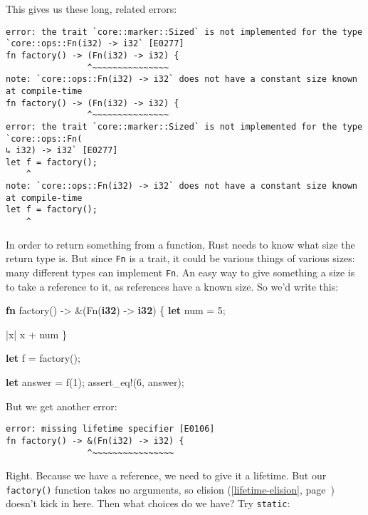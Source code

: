 \documentclass[a4paper,]{book}
\renewcommand*{\hyperref}[2][\ar]{%
  \def\ar{#2}%
  #2 (\autoref{#1}, page~\pageref{#1})}
\newenvironment{Shaded}{\begin{snugshade}}{\end{snugshade}}
\newcommand{\KeywordTok}[1]{\textcolor[rgb]{0.13,0.29,0.53}{\textbf{{#1}}}}
\newcommand{\DecValTok}[1]{\textcolor[rgb]{0.00,0.00,0.81}{{#1}}}
\newcommand{\OtherTok}[1]{\textcolor[rgb]{0.56,0.35,0.01}{{#1}}}
\newcommand{\NormalTok}[1]{{#1}}
\begin{document}
This gives us these long, related errors:

\begin{verbatim}
error: the trait `core::marker::Sized` is not implemented for the type
`core::ops::Fn(i32) -> i32` [E0277]
fn factory() -> (Fn(i32) -> i32) {
                ^~~~~~~~~~~~~~~~
note: `core::ops::Fn(i32) -> i32` does not have a constant size known at compile-time
fn factory() -> (Fn(i32) -> i32) {
                ^~~~~~~~~~~~~~~~
error: the trait `core::marker::Sized` is not implemented for the type `core::ops::Fn(
↳ i32) -> i32` [E0277]
let f = factory();
    ^
note: `core::ops::Fn(i32) -> i32` does not have a constant size known at compile-time
let f = factory();
    ^
\end{verbatim}

In order to return something from a function, Rust needs to know what
size the return type is. But since \texttt{Fn} is a trait, it could be
various things of various sizes: many different types can implement
\texttt{Fn}. An easy way to give something a size is to take a reference
to it, as references have a known size. So we'd write this:

\begin{Shaded}
\begin{Highlighting}[]
\KeywordTok{fn} \NormalTok{factory() -> &(Fn(}\KeywordTok{i32}\NormalTok{) -> }\KeywordTok{i32}\NormalTok{) \{}
    \KeywordTok{let} \NormalTok{num = }\DecValTok{5}\NormalTok{;}

    \NormalTok{|x| x + num}
\NormalTok{\}}

\KeywordTok{let} \NormalTok{f = factory();}

\KeywordTok{let} \NormalTok{answer = f(}\DecValTok{1}\NormalTok{);}
\OtherTok{assert_eq!}\NormalTok{(}\DecValTok{6}\NormalTok{, answer);}
\end{Highlighting}
\end{Shaded}

But we get another error:

\begin{verbatim}
error: missing lifetime specifier [E0106]
fn factory() -> &(Fn(i32) -> i32) {
                ^~~~~~~~~~~~~~~~~
\end{verbatim}

Right. Because we have a reference, we need to give it a lifetime. But
our \texttt{factory()} function takes no arguments, so
\hyperref[lifetime-elision]{elision} doesn't kick in here. Then what
choices do we have? Try \texttt{\textquotesingle{}static}:
\end{document}
